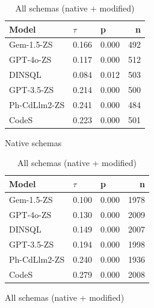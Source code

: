 \begin{table}
  \centering
  \caption{Kendall-Tau ($\tau$) Correlations between \emph{Query Combined Naturalness} and \emph{Query Precision}.}
  \begin{subfigure}{.5\linewidth}
      \centering
      \caption{Native schemas}
      \begin{tabular}{lllr}
\toprule
Model & $\tau$ & p & n \\
\midrule
Gem-1.5-ZS & 0.166 & 0.000 & 492 \\
GPT-4o-ZS & 0.117 & 0.000 & 512 \\
DINSQL & 0.084 & 0.012 & 503 \\
GPT-3.5-ZS & 0.214 & 0.000 & 500 \\
Ph-CdLlm2-ZS & 0.241 & 0.000 & 484 \\
CodeS & 0.223 & 0.000 & 501 \\
\bottomrule
\end{tabular}

      \label{table:precisionktaunative}
  \end{subfigure}%
  \begin{subfigure}{.5\linewidth}
      \centering
      \caption{All schemas (native + modified)}
      \begin{tabular}{lllr}
\toprule
Model & $\tau$ & p & n \\
\midrule
Gem-1.5-ZS & 0.100 & 0.000 & 1978 \\
GPT-4o-ZS & 0.130 & 0.000 & 2009 \\
DINSQL & 0.149 & 0.000 & 2007 \\
GPT-3.5-ZS & 0.194 & 0.000 & 1998 \\
Ph-CdLlm2-ZS & 0.240 & 0.000 & 1936 \\
CodeS & 0.279 & 0.000 & 2008 \\
\bottomrule
\end{tabular}

      \label{table:precisionktauall}
  \end{subfigure}
  
\end{table}


